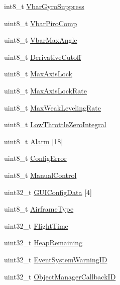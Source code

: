 \begin{DoxyCompactItemize}
int8\-\_\-t \hyperlink{struct____attribute_____ab6be6cd99e6b24918e3c84a0bed692b9}{\-Vbar\-Gyro\-Suppress}
\item 
uint8\-\_\-t \hyperlink{struct____attribute_____a4e50e7ded307e20fcedb9e93e48d3212}{\-Vbar\-Piro\-Comp}
\item 
uint8\-\_\-t \hyperlink{struct____attribute_____a7ddd55c3e30354d5a155bb9f71a3df9f}{\-Vbar\-Max\-Angle}
\item 
uint8\-\_\-t \hyperlink{struct____attribute_____a6b5377feee1094a7a2f64fc2edadced5}{\-Derivative\-Cutoff}
\item 
uint8\-\_\-t \hyperlink{struct____attribute_____a8039c96bd1803d640822a336c4c8cfcf}{\-Max\-Axis\-Lock}
\item 
uint8\-\_\-t \hyperlink{struct____attribute_____a6c79ef4fdb4165baf33d15b69203ca4c}{\-Max\-Axis\-Lock\-Rate}
\item 
uint8\-\_\-t \hyperlink{struct____attribute_____a0177eb3a128dabee11cb03d3cf850bb7}{\-Max\-Weak\-Leveling\-Rate}
\item 
uint8\-\_\-t \hyperlink{struct____attribute_____a7db230ee18e7e568573aa462bf15fcff}{\-Low\-Throttle\-Zero\-Integral}
\item 
uint8\-\_\-t \hyperlink{struct____attribute_____ab7ffe995d8b2bbcbec0b627c9fcb8d5c}{\-Alarm} \mbox{[}18\mbox{]}
\item 
uint8\-\_\-t \hyperlink{struct____attribute_____a8fee755ee2dbe9c6a21bfbcbc4c9e362}{\-Config\-Error}
\item 
uint8\-\_\-t \hyperlink{struct____attribute_____aca7f2257ec4e40de5f23443bba95e56e}{\-Manual\-Control}
\item 
uint32\-\_\-t \hyperlink{struct____attribute_____a6e4119c2472849d347422e0dd081cb7c}{\-G\-U\-I\-Config\-Data} \mbox{[}4\mbox{]}
\item 
uint8\-\_\-t \hyperlink{struct____attribute_____a91a58077ae949f4823b65b94999f3155}{\-Airframe\-Type}
\item 
uint32\-\_\-t \hyperlink{struct____attribute_____a1ca7fc21efab1f1b6fdd67c9da07768c}{\-Flight\-Time}
\item 
uint32\-\_\-t \hyperlink{struct____attribute_____a7974fd00ac400284a9630e0965818a94}{\-Heap\-Remaining}
\item 
uint32\-\_\-t \hyperlink{struct____attribute_____adf57e72eaa80dbac29033af2ffd06a8a}{\-Event\-System\-Warning\-I\-D}
\item 
uint32\-\_\-t \hyperlink{struct____attribute_____a42225757f9652bc3b71e4a960411d0f6}{\-Object\-Manager\-Callback\-I\-D}
\item 

\end{DoxyCompactItemize}
